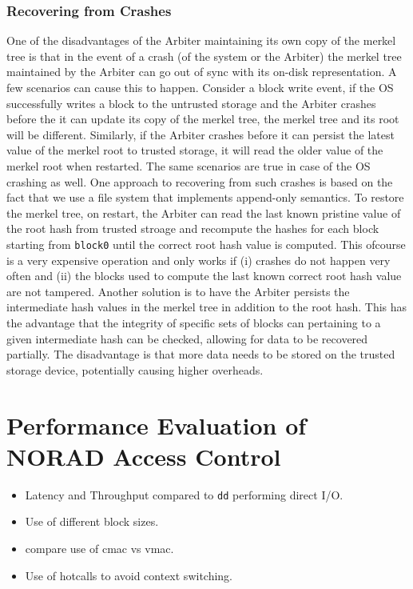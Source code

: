 \documentclass[withindex,glossary]{cam-thesis}
\begin{document}
\subsubsection{Recovering from Crashes}
One of the disadvantages of the Arbiter maintaining its own copy of the merkel tree is that in the event of a crash (of the system or the Arbiter) the merkel tree maintained by the Arbiter can go out of sync with its on-disk representation.
A few scenarios can cause this to happen.
Consider a block write event, if the OS successfully writes a block to the untrusted storage and the Arbiter crashes before the it can update its copy of the merkel tree, the merkel tree and its root will be different.
Similarly, if the Arbiter crashes before it can persist the latest value of the merkel root to trusted storage, it will read the older value of the merkel root when restarted.
The same scenarios are true in case of the OS crashing as well.
One approach to recovering from such crashes is based on the fact that we use a file system that implements append-only semantics.
To restore the merkel tree, on restart, the Arbiter can read the last known pristine value of the root hash from trusted stroage and recompute the hashes for each block starting from \texttt{block0} until the correct root hash value is computed.
This ofcourse is a very expensive operation and only works if (i) crashes do not happen very often and (ii) the blocks used to compute the last known correct root hash value are not tampered.
Another solution is to have the Arbiter persists the intermediate hash values in the merkel tree in addition to the root hash.
This has the advantage that the integrity of specific sets of blocks can pertaining to a given intermediate hash can be checked, allowing for data to be recovered partially.
The disadvantage is that more data needs to be stored on the trusted storage device, potentially causing higher overheads.


\section{Performance Evaluation of NORAD Access Control}
\begin{itemize}
\item Latency and Throughput compared to \texttt{dd} performing direct I/O.
\item Use of different block sizes.
\item compare use of cmac vs vmac.
\item Use of hotcalls to avoid context switching.
\end{itemize}
\end{document}
